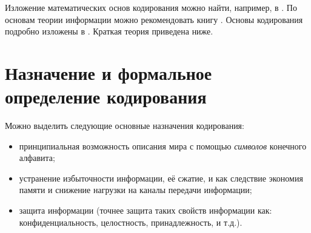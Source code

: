 Изложение  математических основ кодирования можно найти, например, в \cite{bib:novic:discrmathprogrammer,bib:yablonsky:discreteintro}. По основам теории информации можно рекомендовать книгу \cite{bib:panin:informationTheory}. Основы кодирования подробно изложены в \cite{bib:verner:codingBase}. Краткая теория приведена ниже.


\section{Назначение и формальное определение кодирования}

Можно выделить следующие основные назначения кодирования:
\begin{itemize}
    \item принципиальная возможность описания мира с помощью \emph{символов} конечного алфавита;
    \item устранение избыточности информации, её сжатие, и как следствие экономия памяти и снижение нагрузки на каналы передачи информации;
    \item защита информации (точнее защита таких свойств информации как: конфиденциальность, целостность, принадлежность, и т.д.).
\end{itemize}


